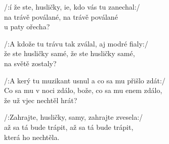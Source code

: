 \ve{}
/:í že ste, husličky, ie, 
kdo vás tu zanechal:/\\
   na trávě poválané,
   na trávě poválané\ \\
   u paty ořecha?


\ve{}
/:A kdože tu trávu tak zválal, aj modré fialy:/\\
   že ste husličky samé, že ste husličky samé, \\
   na světě zostaly?

 \ve{}
 /:A kerý tu muzikant usnul a co sa mu přišlo zdát:/\\
   Co sa mu v noci zdálo, bože, co sa mu enem zdálo,\\
   že už vjec nechtěl hrát?

\ve{}
/:Zahrajte, husličky, samy, zahrajte zvesela:/\\
  až sa tá bude trápit, až sa tá bude trápit,\\
  která ho nechtěla.
 

  \esong{}